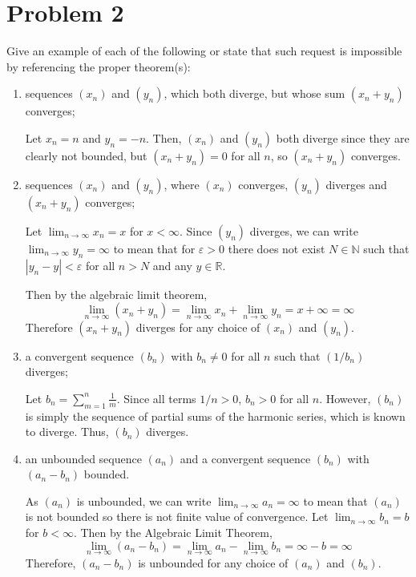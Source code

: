 \documentclass[10pt]{article}
\newcommand{\R}{\mathbb{R}}
\newcommand{\abs}[1]{\left\vert #1 \right\vert}
\newcommand{\ep}{\varepsilon}
\newcommand{\N}{\mathbb{N}}
\begin{document}
\section*{Problem 2}
Give an example of each of the following or state that such request is impossible by referencing the proper theorem(s):
\begin{enumerate}
	\item sequences $(x_n)$ and $(y_n)$, which both diverge, but whose sum $(x_n+y_n)$ converges;
	
        \color{blue}
            Let $x_n = n$ and $y_n = -n$. Then, $(x_n)$ and $(y_n)$ both diverge since they are clearly not bounded, but $(x_n + y_n) = 0$ for all $n$, so $(x_n + y_n)$ converges.
        \color{black}

	\item sequences $(x_n)$ and $(y_n)$, where $(x_n)$ converges, $(y_n)$ diverges and $(x_n+y_n)$ converges;
	
        \color{blue}
            Let $\lim_{n\to \infty} x_n = x$ for $x < \infty$. Since $(y_n)$ diverges, we can write  $\lim_{n\to \infty} y_n = \infty$ to mean that for $\ep > 0$ there does not exist $N \in \N$ such that $\abs{y_n - y} < \ep$ for all $n > N$ and any $y \in \R$.
            
            Then by the algebraic limit theorem, 
            \[\lim_{n\to\infty} (x_n + y_n) = \lim_{n\to \infty} x_n + \lim_{n\to \infty} y_n = x + \infty = \infty\] 
            Therefore $(x_n + y_n)$ diverges for any choice of $(x_n)$ and $(y_n)$. 
        \color{black}

	\item a convergent sequence $(b_n)$ with $b_n\neq0$ for all $n$ such that $(1/b_n)$ diverges;
    
        \color{blue}
            Let $b_n = \sum_{m=1}^n \frac{1}{m}$. Since all terms $1/n > 0$, $b_n > 0$ for all $n$. However, $(b_n)$ is simply the sequence of partial sums of the harmonic series, which is known to diverge. Thus, $(b_n)$ diverges.
        \color{black}

	\item an unbounded sequence $(a_n)$ and a convergent sequence $(b_n)$ with $(a_n-b_n)$ bounded.
    
        \color{blue}
            As $(a_n)$ is unbounded, we can write $\lim_{n\to \infty} a_n = \infty$ to mean that $(a_n)$ is not bounded so there is not finite value of convergence. Let $\lim_{n\to \infty} b_n = b$ for $b < \infty$. Then by the Algebraic Limit Theorem, 
            \[\lim_{n\to \infty} (a_n - b_n) = \lim_{n\to \infty} a_n - \lim_{n\to \infty} b_n = \infty - b = \infty\] 
            Therefore, $(a_n - b_n)$ is unbounded for any choice of $(a_n)$ and $(b_n)$.          
        \color{black}

\end{enumerate}
\end{document}
